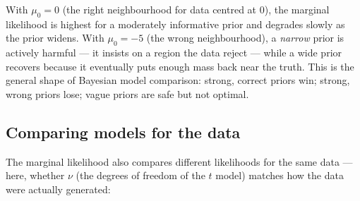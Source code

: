 \documentclass[
  letterpaper,
  DIV=11,
  numbers=noendperiod]{scrreprt}
\begin{document}
With \(\mu_0 = 0\) (the right neighbourhood for data centred at \(0\)),
the marginal likelihood is highest for a moderately informative prior
and degrades slowly as the prior widens. With \(\mu_0 = -5\) (the wrong
neighbourhood), a \emph{narrow} prior is actively harmful --- it insists
on a region the data reject --- while a wide prior recovers because it
eventually puts enough mass back near the truth. This is the general
shape of Bayesian model comparison: strong, correct priors win; strong,
wrong priors lose; vague priors are safe but not optimal.

\subsection{Comparing models for the
data}\label{comparing-models-for-the-data}

The marginal likelihood also compares different likelihoods for the same
data --- here, whether \(\nu\) (the degrees of freedom of the \(t\)
model) matches how the data were actually generated:
\end{document}
